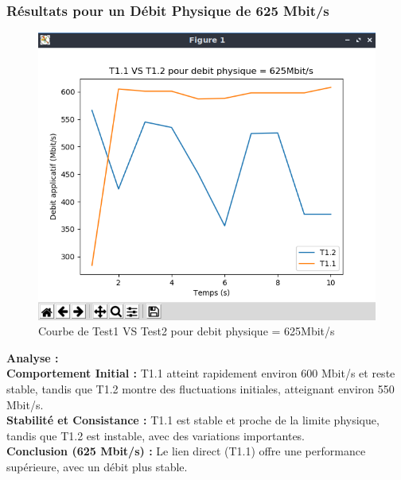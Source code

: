 \subsubsection{Résultats pour un Débit Physique de 625 Mbit/s}
\begin{figure}[H]
    \centering
    \includegraphics[width=1\textwidth]{./images/T1vsT2pour625.png}
    \caption{Courbe de Test1 VS Test2 pour debit physique = 625Mbit/s}
    \label{fig:exemple}
\end{figure}

\textbf{Analyse :}\\
\textbf{Comportement Initial :} T1.1 atteint rapidement environ 600 Mbit/s et reste stable, tandis que T1.2 montre des fluctuations initiales, atteignant environ 550 Mbit/s.\\
\textbf{Stabilité et Consistance :} T1.1 est stable et proche de la limite physique, tandis que T1.2 est instable, avec des variations importantes.\\
\textbf{Conclusion (625 Mbit/s) :} Le lien direct (T1.1) offre une performance supérieure, avec un débit plus stable.

